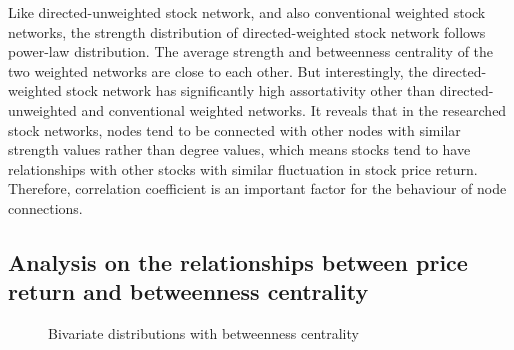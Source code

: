 Like directed-unweighted stock network, and also conventional weighted stock networks, the strength distribution of directed-weighted stock network follows power-law distribution. The average strength and betweenness centrality of the two weighted networks are close to each other. But interestingly, the directed-weighted stock network has significantly high assortativity other than directed-unweighted and conventional weighted networks. It reveals that in the researched stock networks, nodes tend to be connected with other nodes with similar strength values rather than degree values, which means stocks tend to have relationships with other stocks with similar fluctuation in stock price return. Therefore, correlation coefficient is an important factor for the behaviour of node connections.

\subsection{Analysis on the relationships between price return and betweenness centrality}
\begin{figure}
	\hfill%
	\caption{Bivariate distributions with betweenness centrality} \label{fig:bivariate}
\end{figure}

